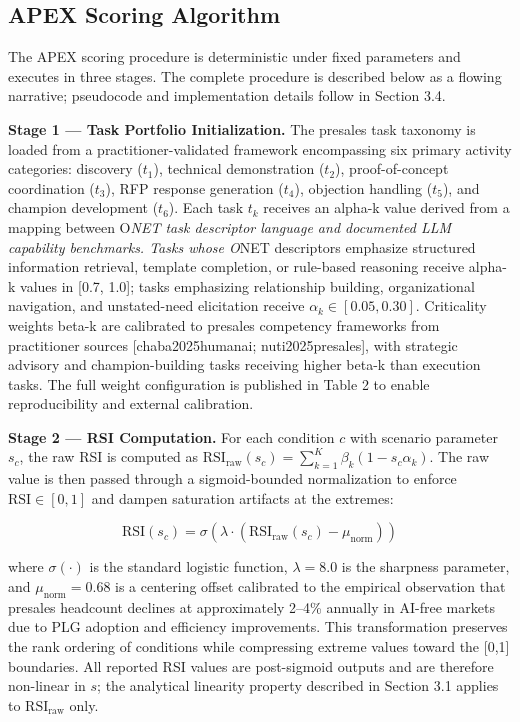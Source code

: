 \documentclass[10pt, conference]{IEEEtran}
\begin{document}
\subsection{APEX Scoring Algorithm}

\label{sec:apex_scoring_algorithm}

The APEX scoring procedure is deterministic under fixed parameters and executes in three stages. The complete procedure is described below as a flowing narrative; pseudocode and implementation details follow in Section 3.4.

\textbf{Stage 1 --- Task Portfolio Initialization.} The presales task taxonomy is loaded from a practitioner-validated framework encompassing six primary activity categories: discovery ($t_1$), technical demonstration ($t_2$), proof-of-concept coordination ($t_3$), RFP response generation ($t_4$), objection handling ($t_5$), and champion development ($t_6$). Each task $t_k$ receives an alpha-k value derived from a mapping between O\textit{NET task descriptor language and documented LLM capability benchmarks. Tasks whose O}NET descriptors emphasize structured information retrieval, template completion, or rule-based reasoning receive alpha-k values in [0.7, 1.0]; tasks emphasizing relationship building, organizational navigation, and unstated-need elicitation receive $\alpha_k \in [0.05, 0.30]$. Criticality weights beta-k are calibrated to presales competency frameworks from practitioner sources [chaba2025humanai; nuti2025presales], with strategic advisory and champion-building tasks receiving higher beta-k than execution tasks. The full weight configuration is published in Table 2 to enable reproducibility and external calibration.

\textbf{Stage 2 --- RSI Computation.} For each condition $c$ with scenario parameter $s_c$, the raw RSI is computed as $\text{RSI}_{\text{raw}}(s_c) = \sum_{k=1}^{K} \beta_k (1 - s_c \alpha_k)$. The raw value is then passed through a sigmoid-bounded normalization to enforce $\text{RSI} \in [0,1]$ and dampen saturation artifacts at the extremes:

\begin{equation}
\text{RSI}(s_c) = \sigma\!\left(\lambda \cdot \left(\text{RSI}_{\text{raw}}(s_c) - \mu_{\text{norm}}\right)\right)
\end{equation}

where $\sigma(\cdot)$ is the standard logistic function, $\lambda = 8.0$ is the sharpness parameter, and $\mu_{\text{norm}} = 0.68$ is a centering offset calibrated to the empirical observation that presales headcount declines at approximately 2--4\% annually in AI-free markets due to PLG adoption and efficiency improvements. This transformation preserves the rank ordering of conditions while compressing extreme values toward the [0,1] boundaries. All reported RSI values are post-sigmoid outputs and are therefore non-linear in $s$; the analytical linearity property described in Section 3.1 applies to $\text{RSI}_{\text{raw}}$ only.
\end{document}
